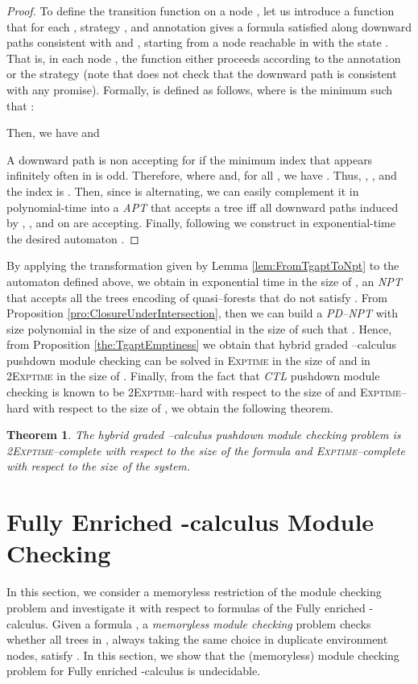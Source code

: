 \documentclass{LMCS}
\theoremstyle{plain}
\def \CTL           {\emph{CTL}\xspace}
\def \EXPTIME       {\textsc{Exptime}\xspace}
\def \NPT           {\emph{NPT}\xspace}
\def \PDNPT         {\emph{PD--NPT}\xspace}
\def \TAPT          {\emph{APT}\xspace}
\def \TWOEXPTIME    {\textsc{2Exptime}\xspace}
\newtheorem{theorem}{Theorem}
\begin{document}
\begin{proof}
To define the transition function on a node , let us introduce
a function  that for each , strategy , and annotation  gives a formula satisfied along
downward paths consistent with  and , starting from
a node reachable in  with the state . That is, in each node
, the function  either proceeds according to the annotation
 or the strategy  (note that  does not check that
the downward path is consistent with any promise). Formally, 
is defined as follows, where  is the minimum  such
that : {\small
    }

Then, we have  and

{\small
}
\noindent A downward path  is non accepting for  if the
minimum index that appears infinitely often in  is odd.
Therefore,  where
 and, for all , we
have . Thus,
, , and
the index is . Then, since  is alternating, we can easily
complement it in polynomial-time into a \TAPT  that
accepts a tree iff all downward paths induced by ,
, and  on  are accepting. Finally,
following \cite{Var98} we construct in exponential-time the
desired automaton .
\end{proof}

By applying the transformation given by Lemma
\ref{lem:FromTgaptToNpt} to the automaton 
defined above, we obtain in exponential time in the size of
, an \NPT that accepts all the trees encoding of
quasi--forests that do not satisfy . From Proposition
\ref{pro:ClosureUnderIntersection}, then we can build a \PDNPT
 with size polynomial in the
size of  and exponential in the size of  such that
. Hence, from Proposition
\ref{the:TgaptEmptiness} we obtain that hybrid graded
--calculus pushdown module checking can be solved in \EXPTIME
in the size of  and in \TWOEXPTIME in the size of .
Finally, from the fact that \CTL pushdown module checking is known
to be \TWOEXPTIME--hard with respect to the size of  and
\EXPTIME--hard with respect to the size of  \cite{BMP05}, we
obtain the following theorem.

\begin{theorem}\label{the:HybridGradedPushdownModuleChecking}
The hybrid graded --calculus pushdown module checking problem
is \TWOEXPTIME--complete with respect to the size of the formula
and \EXPTIME--complete with respect to the size of the system.
\end{theorem}

\section{Fully Enriched -calculus Module Checking}\label{sec:FullyEnrichedModuleChecking}
In this section, we consider a memoryless restriction of the
module checking problem and investigate it with respect to
formulas of the Fully enriched -calculus. Given a formula
, a \emph{memoryless module checking} problem checks
whether all trees in , always taking the same choice in
duplicate environment nodes, satisfy . In this section,
we show that the (memoryless) module checking problem for Fully
enriched -calculus is undecidable.
\end{document}
